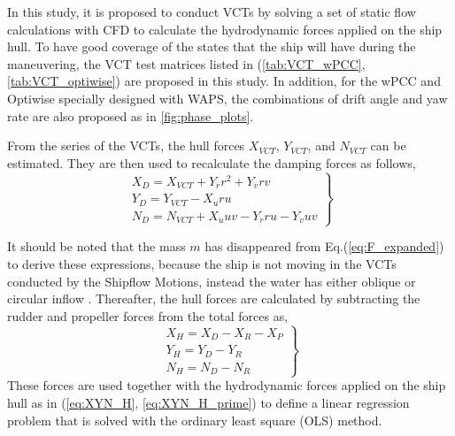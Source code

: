 \noindent In this study, it is proposed to conduct VCTs by solving a set of static flow calculations with CFD to calculate the hydrodynamic forces applied on the ship hull. To have good coverage of the states that the ship will have during the maneuvering, the VCT test matrices listed in (\autoref{tab:VCT_wPCC}, \autoref{tab:VCT_optiwise}) are proposed in this study. In addition, for the wPCC and Optiwise specially designed with WAPS, the combinations of drift angle and yaw rate are also proposed as in \autoref{fig:phase_plots}. 


From the series of the VCTs, the hull forces  $X_{VCT}$, $Y_{VCT}$, and $N_{VCT}$ can be estimated. They are then used to recalculate the damping forces as follows,
\begin{equation}
    \label{eq:X_D}
    \left.\begin{aligned}
    X_{D} = X_{VCT} + Y_{\dot{r}} r^{2} + Y_{\dot{v}} r v \\
    Y_{D} =  Y_{VCT} - X_{\dot{u}} r u\\
    N_{D} = N_{VCT} + X_{\dot{u}} u v - Y_{\dot{r}} r u - Y_{\dot{v}} u v
    \end{aligned}\right\}
\end{equation}

It should be noted that the mass $m$ has disappeared from Eq.(\ref{eq:F_expanded}) to derive these expressions, because the ship is not moving in the VCTs conducted by the Shipflow Motions, instead the water has either oblique or circular inflow \citep{roychoudhuryCFDSimulationsSteady2017}.
Thereafter, the hull forces are calculated by subtracting the rudder and propeller forces from the total forces as,
\begin{equation}
    \label{eq:X_H_VCT}
    \left.\begin{aligned}
    X_H = X_D - X_R - X_P \\
    Y_H = Y_D - Y_R \\
    N_H = N_D - N_R
    \end{aligned}\right\}
\end{equation}
These forces are used together with the hydrodynamic forces applied on the ship hull as in (\autoref{eq:XYN_H}, \autoref{eq:XYN_H_prime}) to define a linear regression problem that is solved with the ordinary least square (OLS) method.


